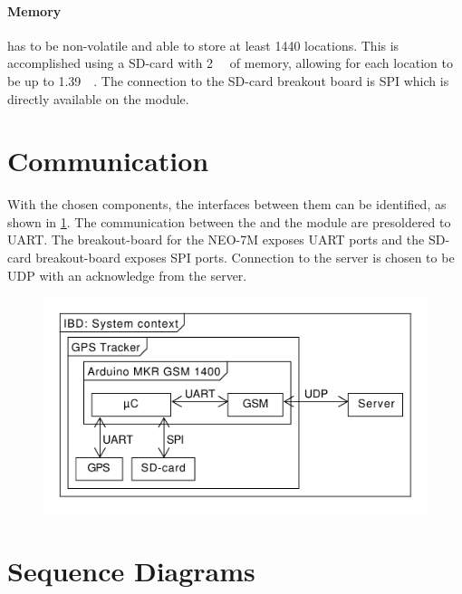 \paragraph{Memory} has to be non-volatile and able to store at least 1440 locations.
This is accomplished using a SD-card with \SI{2}{\giga\byte} of memory, allowing for each location to be up to \SI{1.39}{\mega\byte}.
The connection to the SD-card breakout board is SPI which is directly available on the \MKR module.

\section{Communication}
With the chosen components, the interfaces between them can be identified, as shown in \cref{fig:IBD:overall}.
The communication between the \SAMD and the \SARA module are presoldered to UART.
The breakout-board for the NEO-7M exposes UART ports and the SD-card breakout-board exposes SPI ports.
Connection to the server is chosen to be UDP with an acknowledge from the server.

\begin{figure}
	\centering
	\includegraphics[width=0.7\linewidth]{gfx/Design/Overall_IBD.pdf}
	\caption{}
	\label{fig:IBD:overall}
\end{figure}


\section{Sequence Diagrams}

